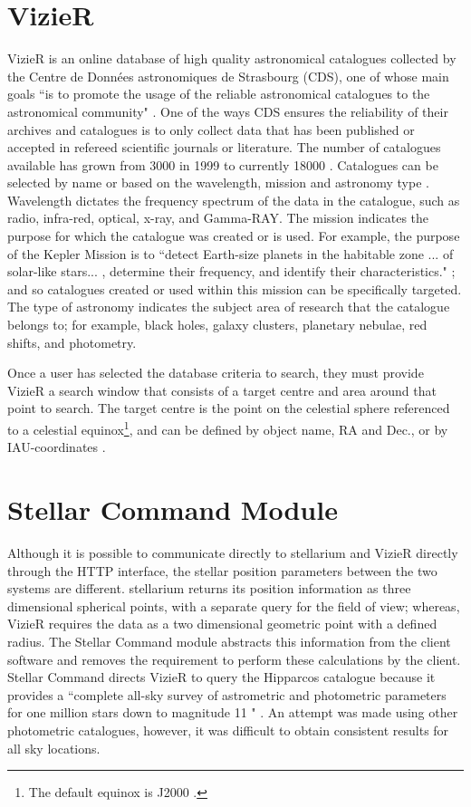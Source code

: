 \section{VizieR}
VizieR is an online database of high quality astronomical catalogues collected by the Centre de Donn\'ees astronomiques de Strasbourg (CDS), one of whose main goals  ``is to promote the usage of the reliable astronomical catalogues to the astronomical community" \cite[p.~25]{ochsenbein2000vizier}. One of the ways CDS ensures the reliability of their archives and catalogues is to only collect data that has been published or accepted in refereed scientific journals or literature. The number of catalogues available has grown from 3000 in 1999  \cite[p.~24]{ochsenbein2000vizier} to currently 18000 \cite{VizierPage}. Catalogues can be selected by name or based on the wavelength, mission and astronomy type \cite{vizquery}.  Wavelength dictates the frequency spectrum of the data in the catalogue, such as radio, infra-red, optical, x-ray, and Gamma-RAY. The mission indicates the purpose for which the catalogue was created or is used. For example, the purpose of the Kepler Mission is to ``detect Earth-size planets in the habitable zone ... of solar-like stars... , determine their frequency, and identify their characteristics." \cite[p.~2]{koch2010kepler}; and so catalogues created or used within this mission can be specifically targeted. The type of astronomy indicates the subject area of research that the catalogue belongs to; for example,  black holes, galaxy clusters, planetary nebulae, red shifts, and photometry. 

Once a user has selected the database criteria to search, they must provide VizieR  a search window that consists of a target centre and area around that point to search. The target centre is the point on the celestial sphere referenced to a celestial equinox\footnote{The default equinox is J2000 \cite{vizquery}.}, and can be defined by object name,  RA and Dec., or by IAU-coordinates \cite{vizquerytarget}.


\section{Stellar Command Module}
Although it is possible to communicate directly to stellarium and VizieR directly through the HTTP interface, the stellar position parameters between the two systems are different. stellarium returns its position information as three dimensional spherical points, with a separate query for the field of view; whereas, VizieR requires the data as a two dimensional geometric point with a defined radius. The Stellar Command module abstracts this information from the client software and removes the requirement to perform these calculations by the client. Stellar Command directs VizieR to query the Hipparcos catalogue because it provides a ``complete all-sky survey of astrometric and photometric parameters for one million stars down to magnitude 11 " \cite [p. ~201]{van1997hipparcos}. An attempt was made using other photometric catalogues, however, it was difficult to obtain consistent results for all sky locations.

